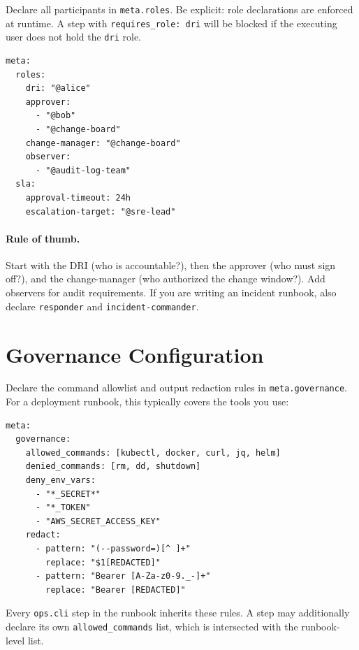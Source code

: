Declare all participants in \texttt{meta.roles}. Be explicit: role declarations are enforced
at runtime. A step with \texttt{requires\_role: dri} will be blocked if the executing user
does not hold the \texttt{dri} role.

\begin{verbatim}
meta:
  roles:
    dri: "@alice"
    approver:
      - "@bob"
      - "@change-board"
    change-manager: "@change-board"
    observer:
      - "@audit-log-team"
  sla:
    approval-timeout: 24h
    escalation-target: "@sre-lead"
\end{verbatim}

\paragraph{Rule of thumb.} Start with the DRI (who is accountable?), then the approver
(who must sign off?), and the change-manager (who authorized the change window?). Add
observers for audit requirements. If you are writing an incident runbook, also declare
\texttt{responder} and \texttt{incident-commander}.

\section{Governance Configuration}
\label{sec:authoring-governance}

Declare the command allowlist and output redaction rules in \texttt{meta.governance}.
For a deployment runbook, this typically covers the tools you use:

\begin{verbatim}
meta:
  governance:
    allowed_commands: [kubectl, docker, curl, jq, helm]
    denied_commands: [rm, dd, shutdown]
    deny_env_vars:
      - "*_SECRET*"
      - "*_TOKEN"
      - "AWS_SECRET_ACCESS_KEY"
    redact:
      - pattern: "(--password=)[^ ]+"
        replace: "$1[REDACTED]"
      - pattern: "Bearer [A-Za-z0-9._-]+"
        replace: "Bearer [REDACTED]"
\end{verbatim}

Every \texttt{ops.cli} step in the runbook inherits these rules. A step may additionally
declare its own \texttt{allowed\_commands} list, which is intersected with the runbook-level
list.

